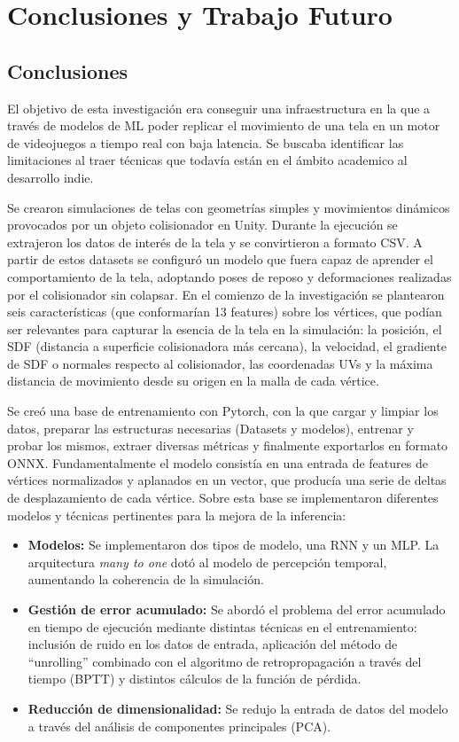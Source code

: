 \chapter{Conclusiones y Trabajo Futuro}
\label{cap:conclusiones}

\section{Conclusiones}
El objetivo de esta investigación era conseguir una infraestructura en la que a través de modelos de ML poder replicar el movimiento de una tela en un motor de videojuegos a tiempo real con baja latencia. Se buscaba identificar las limitaciones al traer técnicas que todavía están en el ámbito academico al desarrollo indie. \newline

Se crearon simulaciones de telas con geometrías simples y movimientos dinámicos provocados por un objeto colisionador en Unity. Durante la ejecución se extrajeron los datos de interés de la tela y se convirtieron a formato CSV. A partir de estos datasets se configuró un modelo que fuera capaz de aprender el comportamiento de la tela, adoptando poses de reposo y deformaciones realizadas por el colisionador sin colapsar. En el comienzo de la investigación se plantearon seis características (que conformarían 13 features) sobre los vértices, que podían ser relevantes para capturar la esencia de la tela en la simulación: la posición, el SDF (distancia a superficie colisionadora más cercana), la velocidad, el gradiente de SDF o normales respecto al colisionador, las coordenadas UVs y la máxima distancia de movimiento desde su origen en la malla de cada vértice. \newline

Se creó una base de entrenamiento con Pytorch, con la que cargar y limpiar los datos, preparar las estructuras necesarias (Datasets y modelos), entrenar y probar los mismos, extraer diversas métricas y finalmente exportarlos en formato ONNX. Fundamentalmente el modelo consistía en una entrada de features de vértices normalizados y aplanados en un vector, que producía una serie de deltas de desplazamiento de cada vértice. Sobre esta base se implementaron diferentes modelos y técnicas pertinentes para la mejora de la inferencia:
\begin{itemize}
    \item \textbf{Modelos:} Se implementaron dos tipos de modelo, una RNN y un MLP. La arquitectura \textit{many to one} dotó al modelo de percepción temporal, aumentando la coherencia de la simulación.
    \item \textbf{Gestión de error acumulado:} Se abordó el problema del error acumulado en tiempo de ejecución mediante distintas técnicas en el entrenamiento: inclusión de ruido en los datos de entrada, aplicación del método de ``unrolling'' combinado con el algoritmo de retropropagación a través del tiempo (BPTT) y distintos cálculos de la función de pérdida.
    \item \textbf{Reducción de dimensionalidad:} Se redujo la entrada de datos del modelo a través del análisis de componentes principales (PCA).
\end{itemize}

